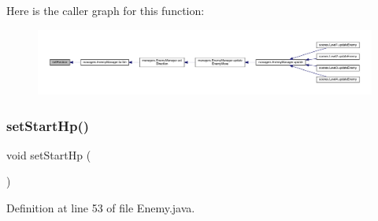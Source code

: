 Here is the caller graph for this function\+:
\nopagebreak
\begin{figure}[H]
\begin{center}
\leavevmode
\includegraphics[width=350pt]{classenemies_1_1_enemy_ad6c107fadf835c74a229f8cac0cc98ab_icgraph}
\end{center}
\end{figure}
\mbox{\label{classenemies_1_1_enemy_a36ff8539de48d58a670cd19251abe658}} 
\subsubsection{\texorpdfstring{set\+Start\+Hp()}{setStartHp()}}
{\footnotesize\ttfamily void set\+Start\+Hp (\begin{DoxyParamCaption}{ }\end{DoxyParamCaption})\hspace{0.3cm}{\ttfamily [protected]}}



Definition at line 53 of file Enemy.\+java.

